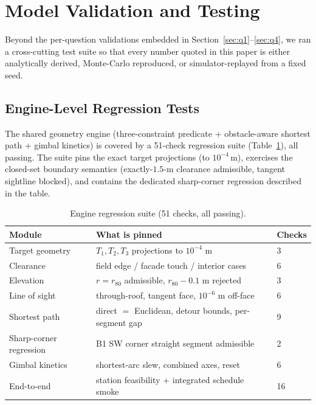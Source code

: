 \section{Model Validation and Testing}\label{sec:testing}

Beyond the per-question validations embedded in Section~\ref{sec:q1}--\ref{sec:q4},
we ran a cross-cutting test suite so that every number quoted in this paper is either
analytically derived, Monte-Carlo reproduced, or simulator-replayed from a fixed seed.

\subsection{Engine-Level Regression Tests}

The shared geometry engine (three-constraint predicate + obstacle-aware shortest path +
gimbal kinetics) is covered by a 51-check regression suite (Table~\ref{tab:testsuite}),
all passing. The suite pins the exact target projections (to $10^{-4}\,\mathrm{m}$),
exercises the closed-set boundary semantics (exactly-$1.5$-m clearance admissible,
tangent sightline blocked), and contains the dedicated sharp-corner regression
described in the table.

\begin{table}[!htb]\centering\footnotesize
\caption{Engine regression suite (51 checks, all passing).}
\label{tab:testsuite}
\begin{tabular}{lll}
\toprule
Module & What is pinned & Checks \\
\midrule
Target geometry & $T_1,T_2,T_3$ projections to $10^{-4}$ m & 3 \\
Clearance & field edge / facade touch / interior cases & 6 \\
Elevation & $r=r_{80}$ admissible, $r_{80}-0.1$ m rejected & 3 \\
Line of sight & through-roof, tangent face, $10^{-6}$ m off-face & 6 \\
Shortest path & direct $=$ Euclidean, detour bounds, per-segment gap & 9 \\
Sharp-corner regression & B1 SW corner straight segment admissible & 2 \\
Gimbal kinetics & shortest-arc slew, combined axes, reset & 6 \\
End-to-end & station feasibility + integrated schedule smoke & 16 \\
\bottomrule
\end{tabular}
\end{table}

